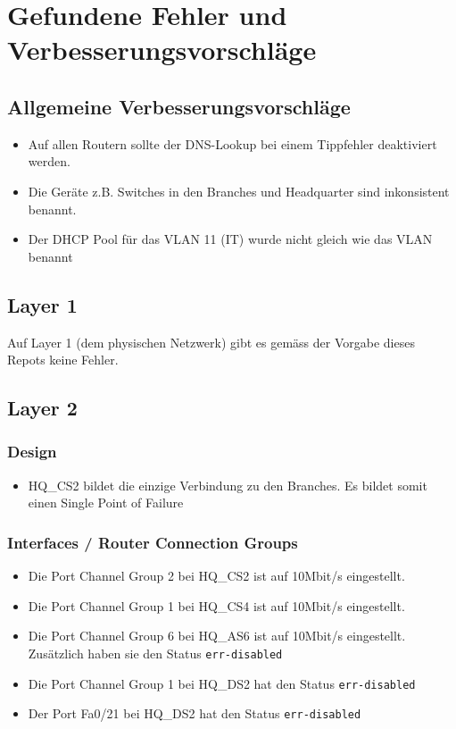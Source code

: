 



\section{Gefundene Fehler und Verbesserungsvorschläge}


\subsection{Allgemeine Verbesserungsvorschläge}

\begin{itemize}
	\item Auf allen Routern sollte der DNS-Lookup bei einem Tippfehler deaktiviert werden.
	\item Die Geräte z.B. Switches in den Branches und Headquarter sind inkonsistent benannt.
	\item Der DHCP Pool für das VLAN 11 (IT) wurde nicht gleich wie das VLAN benannt
\end{itemize}

\subsection{Layer 1}
Auf Layer 1 (dem physischen Netzwerk) gibt es gemäss der Vorgabe dieses Repots keine Fehler.

\subsection{Layer 2}
\subsubsection{Design}
\begin{itemize}
	\item HQ\_CS2 bildet die einzige Verbindung zu den Branches. Es bildet somit einen Single Point of Failure
\end{itemize}

\subsubsection{Interfaces / Router Connection Groups}
\begin{itemize}
	\item Die Port Channel Group 2 bei HQ\_CS2 ist auf 10Mbit/s eingestellt. 
	\item Die Port Channel Group 1 bei HQ\_CS4 ist auf 10Mbit/s eingestellt. 
	\item Die Port Channel Group 6 bei HQ\_AS6 ist auf 10Mbit/s eingestellt. Zusätzlich haben sie den Status \lstinline|err-disabled|
	\item Die Port Channel Group 1 bei HQ\_DS2 hat den Status \lstinline|err-disabled|
	\item Der Port Fa0/21 bei HQ\_DS2 hat den Status \lstinline|err-disabled|
\end{itemize}

